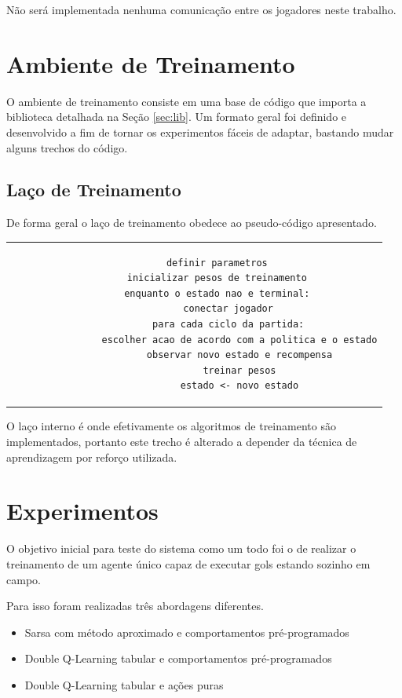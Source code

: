 Não será implementada nenhuma comunicação entre os jogadores neste trabalho.


\section{Ambiente de Treinamento}

O ambiente de treinamento consiste em uma base de código que importa a biblioteca detalhada na Seção \ref{sec:lib}. Um formato geral foi definido e desenvolvido a fim de tornar os experimentos fáceis de adaptar, bastando mudar alguns trechos do código.

\subsection{Laço de Treinamento}

De forma geral o laço de treinamento obedece ao pseudo-código apresentado.

\begin{tabular}{c}
	\begin{lstlisting}
		definir parametros
		inicializar pesos de treinamento
		enquanto o estado nao e terminal:
			conectar jogador
			para cada ciclo da partida:
				escolher acao de acordo com a politica e o estado
				observar novo estado e recompensa
				treinar pesos
				estado <- novo estado
	\end{lstlisting}
\end{tabular}

O laço interno é onde efetivamente os algoritmos de treinamento são implementados, portanto este trecho é alterado a depender da técnica de aprendizagem por reforço utilizada.


\section{Experimentos}

O objetivo inicial para teste do sistema como um todo foi o de realizar o treinamento de um agente único capaz de executar gols estando sozinho em campo.

Para isso foram realizadas três abordagens diferentes.

\begin{itemize}
	\item Sarsa com método aproximado e comportamentos pré-programados
	\item Double Q-Learning tabular e comportamentos pré-programados
	\item Double Q-Learning tabular e ações puras
\end{itemize}

